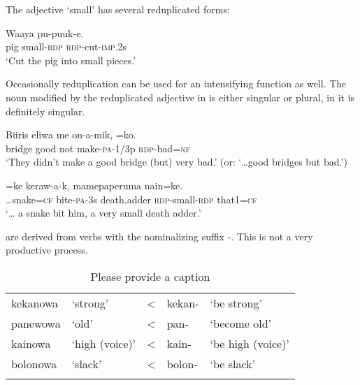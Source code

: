 The adjective  `small' has several reduplicated forms: \textstyleEmphasizedVernacularWords{,} \textstyleEmphasizedVernacularWords{,}  

\ea%
\label{ex:3:x486}
\gll Waaya  pu-puuk-e. \\
pig small-\textsc{rdp} \textsc{rdp}-cut-\textsc{imp}.2s\\
\glt`Cut the pig into small pieces.'
\z

Occasionally reduplication can be used for an intensifying function as well. The noun modified by the reduplicated adjective in  is either singular or plural, in  it is definitely singular.

\ea%
\label{ex:3:x485}
\gll Biiris eliwa me on-a-mik, =ko. \\
bridge good not make-\textsc{pa}-1/3p \textsc{rdp}-bad=\textsc{nf}\\
\glt`They didn't make a good bridge (but) very bad.' (or: `{\dots}good bridges but bad.')
\z

\ea%
\label{ex:3:x86}
=ke keraw-a-k, mamepaperuma  nain=ke. \\
{\dots}snake=\textsc{cf} bite-\textsc{pa}-3s death.adder \textsc{rdp}-small-\textsc{rdp} that1=\textsc{cf}\\
\glt`{\dots} a snake bit him, a very small death adder.'
\z

 are derived from verbs with the nominalizing suffix \nobreakdash-. This is not a very productive process.

\begin{table}
\caption{Please provide a caption}
\label{} 
\begin{tabular}{llcll}
\mytoprule
kekanowa &`strong' &{{\textless}} &kekan- &`be strong'\\
panewowa &`old' &{{\textless}} &pan- &`become old'\\
kainowa &`high (voice)' &{{\textless}} &kain- &`be high (voice)'\\
bolonowa &`slack' &{{\textless}} &bolon- &`be slack'\\
\mybottomrule
\end{tabular}
\end{table}


